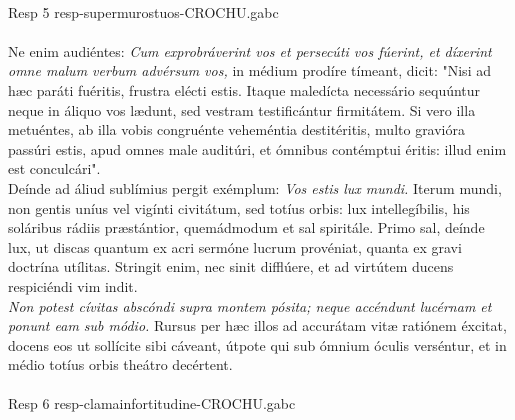 \documentclass[options]{article}
\begin{document}
		\\
		Resp 5 resp-supermurostuos-CROCHU.gabc\\
		\\
		Ne enim audiéntes:
		\emph{Cum exprobráverint vos et persecúti vos fúerint, et díxerint omne malum verbum advérsum vos,}
		in médium prodíre tímeant, dicit: "Nisi ad hæc paráti fuéritis, frustra elécti estis. Itaque maledícta necessário sequúntur neque in áliquo vos lædunt, sed vestram testificántur firmitátem. Si vero illa metuéntes, ab illa vobis congruénte veheméntia destitéritis, multo gravióra passúri estis, apud omnes male auditúri, et ómnibus contémptui éritis: illud enim est conculcári".\\
		Deínde ad áliud sublímius pergit exémplum: 
		\emph{Vos estis lux mundi.}
		Iterum mundi, non gentis uníus vel vigínti civitátum, sed totíus orbis: lux intellegíbilis, his soláribus rádiis præstántior, quemádmodum et sal spiritále. Primo sal, deínde lux, ut discas quantum ex acri sermóne lucrum provéniat, quanta ex gravi doctrína utílitas. Stringit enim, nec sinit difflúere, et ad virtútem ducens respiciéndi vim indit.\\
		\emph{Non potest cívitas abscóndi supra montem pósita; neque accéndunt lucérnam et ponunt eam sub módio.}
		Rursus per hæc illos ad accurátam vitæ ratiónem éxcitat, docens eos ut sollícite sibi cáveant, útpote qui sub ómnium óculis verséntur, et in médio totíus orbis theátro decértent.\\
		\\
		
		Resp 6 resp-clamainfortitudine-CROCHU.gabc
		 
	
\end{document}
